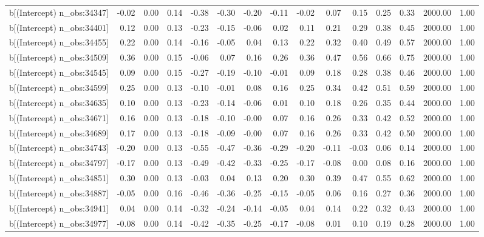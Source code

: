 \begin{table}[ht]
\begin{tabular}{rrrrrrrrrrrrrrr}
  b[(Intercept) n\_obs:34347] & -0.02 & 0.00 & 0.14 & -0.38 & -0.30 & -0.20 & -0.11 & -0.02 & 0.07 & 0.15 & 0.25 & 0.33 & 2000.00 & 1.00 \\ 
  b[(Intercept) n\_obs:34401] & 0.12 & 0.00 & 0.13 & -0.23 & -0.15 & -0.06 & 0.02 & 0.11 & 0.21 & 0.29 & 0.38 & 0.45 & 2000.00 & 1.00 \\ 
  b[(Intercept) n\_obs:34455] & 0.22 & 0.00 & 0.14 & -0.16 & -0.05 & 0.04 & 0.13 & 0.22 & 0.32 & 0.40 & 0.49 & 0.57 & 2000.00 & 1.00 \\ 
  b[(Intercept) n\_obs:34509] & 0.36 & 0.00 & 0.15 & -0.06 & 0.07 & 0.16 & 0.26 & 0.36 & 0.47 & 0.56 & 0.66 & 0.75 & 2000.00 & 1.00 \\ 
  b[(Intercept) n\_obs:34545] & 0.09 & 0.00 & 0.15 & -0.27 & -0.19 & -0.10 & -0.01 & 0.09 & 0.18 & 0.28 & 0.38 & 0.46 & 2000.00 & 1.00 \\ 
  b[(Intercept) n\_obs:34599] & 0.25 & 0.00 & 0.13 & -0.10 & -0.01 & 0.08 & 0.16 & 0.25 & 0.34 & 0.42 & 0.51 & 0.59 & 2000.00 & 1.00 \\ 
  b[(Intercept) n\_obs:34635] & 0.10 & 0.00 & 0.13 & -0.23 & -0.14 & -0.06 & 0.01 & 0.10 & 0.18 & 0.26 & 0.35 & 0.44 & 2000.00 & 1.00 \\ 
  b[(Intercept) n\_obs:34671] & 0.16 & 0.00 & 0.13 & -0.18 & -0.10 & -0.00 & 0.07 & 0.16 & 0.26 & 0.33 & 0.42 & 0.52 & 2000.00 & 1.00 \\ 
  b[(Intercept) n\_obs:34689] & 0.17 & 0.00 & 0.13 & -0.18 & -0.09 & -0.00 & 0.07 & 0.16 & 0.26 & 0.33 & 0.42 & 0.50 & 2000.00 & 1.00 \\ 
  b[(Intercept) n\_obs:34743] & -0.20 & 0.00 & 0.13 & -0.55 & -0.47 & -0.36 & -0.29 & -0.20 & -0.11 & -0.03 & 0.06 & 0.14 & 2000.00 & 1.00 \\ 
  b[(Intercept) n\_obs:34797] & -0.17 & 0.00 & 0.13 & -0.49 & -0.42 & -0.33 & -0.25 & -0.17 & -0.08 & 0.00 & 0.08 & 0.16 & 2000.00 & 1.00 \\ 
  b[(Intercept) n\_obs:34851] & 0.30 & 0.00 & 0.13 & -0.03 & 0.04 & 0.13 & 0.20 & 0.30 & 0.39 & 0.47 & 0.55 & 0.62 & 2000.00 & 1.00 \\ 
  b[(Intercept) n\_obs:34887] & -0.05 & 0.00 & 0.16 & -0.46 & -0.36 & -0.25 & -0.15 & -0.05 & 0.06 & 0.16 & 0.27 & 0.36 & 2000.00 & 1.00 \\ 
  b[(Intercept) n\_obs:34941] & 0.04 & 0.00 & 0.14 & -0.32 & -0.24 & -0.14 & -0.05 & 0.04 & 0.14 & 0.22 & 0.32 & 0.43 & 2000.00 & 1.00 \\ 
  b[(Intercept) n\_obs:34977] & -0.08 & 0.00 & 0.14 & -0.42 & -0.35 & -0.25 & -0.17 & -0.08 & 0.01 & 0.10 & 0.19 & 0.28 & 2000.00 & 1.00 \\ 

\end{tabular}
\end{table}
